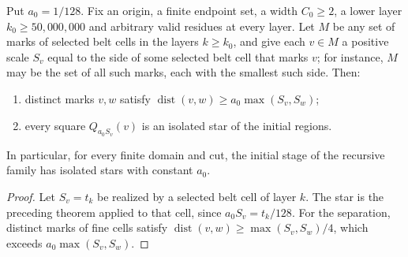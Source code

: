 \begin{lemma}
    \label{thm:area_law_initial_stars}
    \leanok
    Put $a_0=1/128$. Fix an origin, a finite endpoint set, a width
    $C_0\ge2$, a lower layer $k_0\ge50{,}000{,}000$ and arbitrary valid
    residues at every layer. Let $M$ be any set of marks of selected
    belt cells in the layers $k\ge k_0$, and give each $v\in M$ a
    positive scale $S_v$ equal to the side of some selected belt cell
    that marks $v$; for instance, $M$ may be the set of all such marks,
    each with the smallest such side. Then:
    \begin{enumerate}
        \item distinct marks $v,w$ satisfy
              $\operatorname{dist}(v,w)\ge a_0\max(S_v,S_w)$;
        \item every square $Q_{a_0S_v}(v)$ is an isolated star of the
              initial regions.
    \end{enumerate}
    In particular, for every finite domain and cut, the initial stage
    of the recursive family has isolated stars with constant $a_0$.
\end{lemma}
\begin{proof}\leanok
    Let $S_v=t_k$ be realized by a selected belt cell of layer $k$. The
    star is the preceding theorem applied to that cell, since
    $a_0S_v=t_k/128$. For the separation, distinct marks of fine
    cells satisfy $\operatorname{dist}(v,w)\ge\max(S_v,S_w)/4$, which
    exceeds $a_0\max(S_v,S_w)$.
\end{proof}
